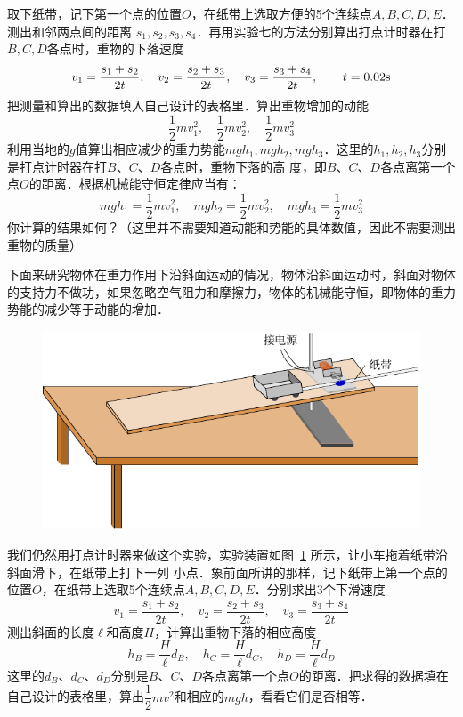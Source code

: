 取下纸带，记下第一个点的位置$O$，在纸带上选取方便的5个连续点$A,B,C,D,E$．测出和邻两点间的距离
$s_1,s_2,s_3,s_4$．再用实验七的方法分别算出打点计时器在打$B,C,D$各点时，重物的下落速度
\[v_1=\frac{s_1+s_2}{2t},\quad v_2=\frac{s_2+s_3}{2t},\quad v_3=\frac{s_3+s_4}{2t},\qquad t=0.02{\rm s}\]
把测量和算出的数据填入自己设计的表格里．算出重物增加的动能
\[\frac{1}{2}mv_1^2, \quad \frac{1}{2}mv_2^2, \quad \frac{1}{2}mv_3^2\]
利用当地的$g$值算出相应减少的重力势能$mgh_1,mgh_2,mgh_3$．这里的$h_1,h_2,h_3$分别是打点计时器在打$B$、$C$、$D$各点时，重物下落的高
度，即$B$、$C$、$D$各点离第一个点$O$的距离．根据机械能守恒定律应当有：
\[mgh_1=\frac{1}{2}mv^2_1,\quad mgh_2=\frac{1}{2}mv^2_2,\quad mgh_3=\frac{1}{2}mv^2_3\]
你计算的结果如何？（这里并不需要知道动能和势能的具体数值，因此不需要测出重物的质量）

下面来研究物体在重力作用下沿斜面运动的情况，物体沿斜面运动时，斜面对物体的支持力不做功，如果忽略空气阻力和摩擦力，物体的机械能守恒，即物体的重力势能的减少等于动能的增加．

\begin{figure}[htbp]
    \centering
    \includegraphics{fig/A/10-17.pdf}
    \caption{}\label{fig_A_10-17}
\end{figure}

我们仍然用打点计时器来做这个实验，实验装置如图~\ref{fig_A_10-17} 所示，让小车拖着纸带沿斜面滑下，在纸带上打下一列
小点．象前面所讲的那样，记下纸带上第一个点的位置$O$，在纸带上选取5个连续点$A,B,C,D,E$．分别求出3个下滑速度
\[v_1=\frac{s_1+s_2}{2t},\quad v_2=\frac{s_2+s_3}{2t},\quad v_3=\frac{s_3+s_4}{2t}\]
测出斜面的长度$\ell$和高度$H$，计算出重物下落的相应高度
\[h_B=\frac{H}{\ell}d_B, \quad h_C=\frac{H}{\ell}d_C, \quad h_D=\frac{H}{\ell}d_D \]
这里的$d_B$、$d_C$、$d_D$分别是$B$、$C$、$D$各点离第一个点$O$的距离．把求得的数据填在自己设计的表格里，算出$\dfrac{1}{2}mv^2$和相应的$mgh$，看看它们是否相等．

